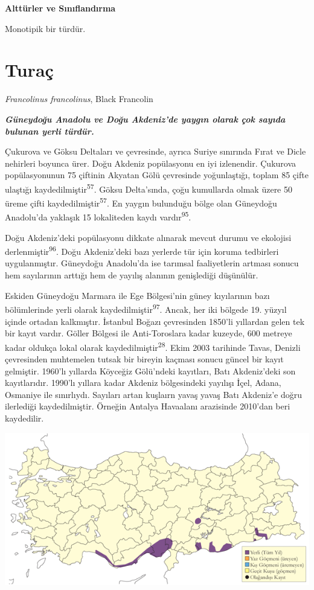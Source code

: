 \documentclass[
  letterpaper,
  DIV=11,
  numbers=noendperiod]{scrreprt}
\begin{document}
\textbf{Alttürler ve Sınıflandırma}

Monotipik bir türdür.

\section{Turaç}\label{turauxe7}

\emph{Francolinus francolinus}, Black Francolin

\textbf{\emph{Güneydoğu Anadolu ve Doğu Akdeniz'de yaygın olarak çok
sayıda bulunan yerli türdür.}}

Çukurova ve Göksu Deltaları ve çevresinde, ayrıca Suriye sınırında Fırat
ve Dicle nehirleri boyunca ürer. Doğu Akdeniz popülasyonu en iyi
izlenendir. Çukurova popülasyonunun 75 çiftinin Akyatan Gölü çevresinde
yoğunlaştığı, toplam 85 çifte ulaştığı
kaydedilmiştir\textsuperscript{57}. Göksu Delta'sında, çoğu kumullarda
olmak üzere 50 üreme çifti kaydedilmiştir\textsuperscript{57}. En yaygın
bulunduğu bölge olan Güneydoğu Anadolu'da yaklaşık 15 lokaliteden kaydı
vardır\textsuperscript{95}.

Doğu Akdeniz'deki popülasyonu dikkate alınarak mevcut durumu ve
ekolojisi derlenmiştir\textsuperscript{96}. Doğu Akdeniz'deki bazı
yerlerde tür için koruma tedbirleri uygulanmıştır. Güneydoğu Anadolu'da
ise tarımsal faaliyetlerin artması sonucu hem sayılarının arttığı hem de
yayılış alanının genişlediği düşünülür.

Eskiden Güneydoğu Marmara ile Ege Bölgesi'nin güney kıyılarının bazı
bölümlerinde yerli olarak kaydedilmiştir\textsuperscript{97}. Ancak, her
iki bölgede 19. yüzyıl içinde ortadan kalkmıştır. İstanbul Boğazı
çevresinden 1850'li yıllardan gelen tek bir kayıt vardır. Göller Bölgesi
ile Anti-Toroslara kadar kuzeyde, 600 metreye kadar oldukça lokal olarak
kaydedilmiştir\textsuperscript{28}. Ekim 2003 tarihinde Tavas, Denizli
çevresinden muhtemelen tutsak bir bireyin kaçması sonucu güncel bir
kayıt gelmiştir. 1960'lı yıllarda Köyceğiz Gölü'ndeki kayıtları, Batı
Akdeniz'deki son kayıtlarıdır. 1990'lı yıllara kadar Akdeniz
bölgesindeki yayılışı İçel, Adana, Osmaniye ile sınırlıydı. Sayıları
artan kuşlaırn yavaş yavaş Batı Akdeniz'e doğru ilerlediği
kaydedilmiştir. Örneğin Antalya Havaalanı arazisinde 2010'dan beri
kaydedilir.

\includegraphics{images/harita_Page_041.png}
\end{document}
